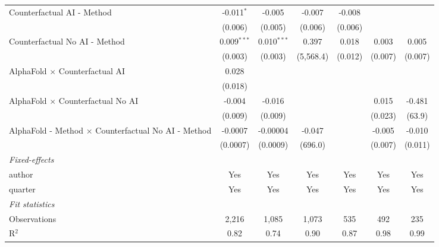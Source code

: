 \begin{tabular}{lcccccc}
   Counterfactual AI - Method                                 & -0.011$^{*}$  & -0.005         & -0.007       & -0.008  &         &   \\   
                                                              & (0.006)       & (0.005)        & (0.006)      & (0.006) &         &   \\   
   Counterfactual No AI - Method                              & 0.009$^{***}$ & 0.010$^{***}$  & 0.397        & 0.018   & 0.003   & 0.005\\   
                                                              & (0.003)       & (0.003)        & (5,568.4)    & (0.012) & (0.007) & (0.007)\\   
   AlphaFold $\times$ Counterfactual AI                       & 0.028         &                &              &         &         &   \\   
                                                              & (0.018)       &                &              &         &         &   \\   
   AlphaFold $\times$ Counterfactual No AI                    & -0.004        & -0.016         &              &         & 0.015   & -0.481\\   
                                                              & (0.009)       & (0.009)        &              &         & (0.023) & (63.9)\\   
   AlphaFold - Method $\times$ Counterfactual No AI - Method  & -0.0007       & -0.00004       & -0.047       &         & -0.005  & -0.010\\   
                                                              & (0.0007)      & (0.0009)       & (696.0)      &         & (0.007) & (0.011)\\   
   \midrule
   \emph{Fixed-effects}\\
   author                                                     & Yes           & Yes            & Yes          & Yes     & Yes     & Yes\\  
   quarter                                                    & Yes           & Yes            & Yes          & Yes     & Yes     & Yes\\  
   \midrule
   \emph{Fit statistics}\\
   Observations                                               & 2,216         & 1,085          & 1,073        & 535     & 492     & 235\\  
   R$^2$                                                      & 0.82          & 0.74           & 0.90         & 0.87    & 0.98    & 0.99\\  

\end{tabular}
